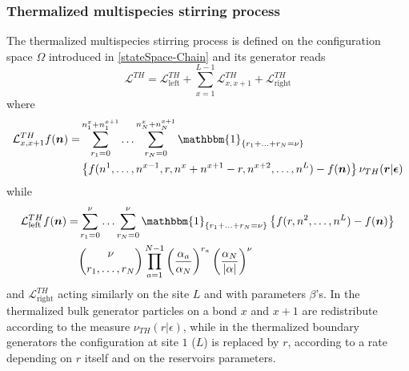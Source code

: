 \documentclass[10pt]{article}
\numberwithin{equation}{section}
\numberwithin{equation}{subsection}
\begin{document}
\subsubsection{Thermalized multispecies stirring process}
The thermalized multispecies stirring process is defined on the configuration space $\Omega$ introduced in \eqref{stateSpace-Chain} and its generator reads
\begin{equation}\label{thermalizedGenerator}
	\mathcal{L}^{TH}=\mathcal{L}_{\text{left}}^{TH}+\sum_{x=1}^{L-1}\mathcal{L}_{x,x+1}^{TH}+\mathcal{L}_{\text{right}}^{TH}
\end{equation}
where 
\begin{equation}\label{bulkThermalized}
	\begin{split}
	\mathcal{L}_{x,x+1}^{TH}f(\bm{n})=&\sum_{r_{1}=0}^{n_{1}^{x}+n_{1}^{x+1}}\ldots\sum_{r_{N}=0}^{n_{N}^{x}+n_{N}^{x+1}}\mathbbm{1}_{\{r_{1}+\ldots+r_{N}=\nu\}}
	\\&
	\left\{f(n^{1},\ldots,n^{x-1},r,n^{x}+n^{x+1}-r,n^{x+2},\ldots,n^{L})-f(\bm{n})\right\}\nu_{TH}(\bm{r}|\bm{\epsilon})
	\end{split}
\end{equation}
while
\begin{equation}\label{boundaryThermalized}
	\begin{split}
		\mathcal{L}_{\text{left}}^{TH}f(\bm{n})=&\sum_{r_{1}=0}^{\nu}\ldots\sum_{r_{N}=0}^{\nu}\mathbbm{1}_{\{r_{1}+\ldots+r_{N}=\nu\}}\left\{f(r,n^{2},\ldots,n^{L})-f(\bm{n})\right\}\\&
		\binom{\nu}{r_{1},\ldots, r_{N}}\prod_{a=1}^{N-1}\left(\frac{\alpha_{a}}{\alpha_{N}}\right)^{r_{a}}\left(\frac{\alpha_{N}}{|\alpha|}\right)^{\nu}
		\end{split}
	\end{equation}
and $\mathcal{L}_{\text{right}}^{TH}$ acting similarly on the site $L$ and with parameters $\beta$'s. 
In the thermalized bulk generator particles on a bond $x$ and $x+1$ are redistribute according to the measure $\nu_{TH}(r|\epsilon)$, while in the thermalized boundary generators the configuration at site $1$ ($L$) is replaced by $r$, according to a rate depending on $r$ itself and on the reservoirs parameters. 
\end{document}
